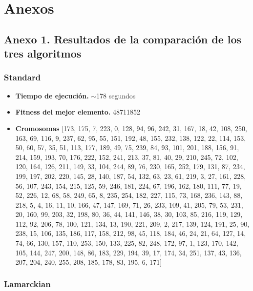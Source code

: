 \chapter{Anexos}
\label{chap:anexos}

\section{Anexo 1. Resultados de la comparación de los tres algoritmos}
\label{anexo:results}

\subsection*{Standard}

\begin{itemize}
	\item \textbf{Tiempo de ejecución.} $\sim$178 segundos
	\item \textbf{Fitness del mejor elemento.} 48711852
	\item \textbf{Cromosomas} [173, 175, 7, 223, 0, 128, 94, 96, 242, 31, 167, 18, 42, 108, 250, 163, 69, 116, 9, 237, 62, 95, 55, 151, 192, 48, 155, 232, 138, 122, 22, 114, 153, 50, 60, 57, 35, 51, 113, 177, 189, 49, 75, 239, 84, 93, 101, 201, 188, 156, 91, 214, 159, 193, 70, 176, 222, 152, 241, 213, 37, 81, 40, 29, 210, 245, 72, 102, 120, 164, 126, 211, 149, 33, 104, 244, 89, 76, 230, 165, 252, 179, 131, 87, 234, 199, 197, 202, 220, 145, 28, 140, 187, 54, 132, 63, 23, 61, 219, 3, 27, 161, 228, 56, 107, 243, 154, 215, 125, 59, 246, 181, 224, 67, 196, 162, 180, 111, 77, 19, 52, 226, 12, 68, 58, 249, 65, 8, 235, 254, 182, 227, 115, 73, 168, 236, 143, 88, 218, 5, 4, 16, 11, 10, 166, 47, 147, 169, 71, 26, 233, 109, 41, 205, 79, 53, 231, 20, 160, 99, 203, 32, 198, 80, 36, 44, 141, 146, 38, 30, 103, 85, 216, 119, 129, 112, 92, 206, 78, 100, 121, 134, 13, 190, 221, 209, 2, 217, 139, 124, 191, 25, 90, 238, 15, 106, 135, 186, 117, 158, 212, 98, 45, 118, 184, 46, 24, 21, 64, 127, 14, 74, 66, 130, 157, 110, 253, 150, 133, 225, 82, 248, 172, 97, 1, 123, 170, 142, 105, 144, 247, 200, 148, 86, 183, 229, 194, 39, 17, 174, 34, 251, 137, 43, 136, 207, 204, 240, 255, 208, 185, 178, 83, 195, 6, 171]
\end{itemize}

\subsection*{Lamarckian}
\label{anexo:best}

